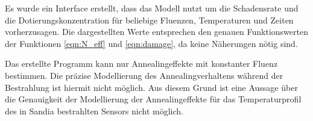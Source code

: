 Es wurde ein Interface erstellt, dass das Modell nutzt um die Schadensrate und die Dotierungskonzentration
für beliebige Fluenzen, Temperaturen und
Zeiten vorherzusagen. Die dargestellten Werte entsprechen den genauen Funktionswerten
der Funktionen \ref{eqn:N_eff} und \ref{eqn:damage}, da keine Näherungen nötig sind.

Das erstellte Programm kann nur Annealingeffekte mit konstanter Fluenz bestimmen.
Die präzise Modellierung des Annealingverhaltens während der Bestrahlung ist
hiermit nicht möglich. Aus diesem Grund ist eine Aussage über die Genauigkeit der
Modellierung der Annealingeffekte für das Temperaturprofil des in Sandia bestrahlten Sensors nicht möglich.



